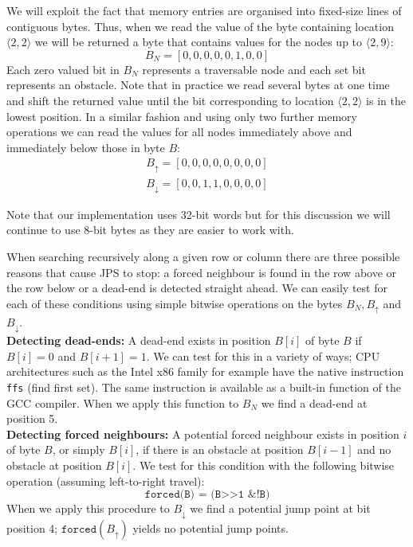 We will exploit the fact that memory entries are organised into fixed-size 
lines of contiguous bytes. Thus, when we read the value of the
byte containing location $\langle 2, 2\rangle$ we will be returned a byte
that contains values for the nodes up to $\langle 2, 9\rangle$:
\begin{equation}
B_{N} = [0,0,0,0,0,1,0,0]
\end{equation}
Each zero valued bit in $B_N$ represents a traversable node and each set bit
represents an obstacle.  Note that in practice we read several bytes at one
time and shift the returned value until the bit corresponding to location
$\langle 2, 2\rangle$ is in the lowest position. In a similar fashion and
using only two further memory operations we can read the values for all nodes
immediately above and immediately below those in byte $B$:
\begin{gather}
B_{\uparrow} = [0, 0, 0, 0, 0, 0, 0, 0]\\
B_{\downarrow} = [0, 0, 1, 1, 0, 0, 0, 0]
\end{gather}

Note that our implementation uses 32-bit words but for this discussion
we will continue to use 8-bit bytes as they are easier to work with.  

When searching recursively along a given row or column
there are three possible reasons that cause JPS to stop: 
a forced neighbour is found in the row above or the row below or a 
dead-end is detected straight ahead.
We can easily test for each of these conditions using simple
bitwise operations on the bytes $B_{N}, B_{\uparrow}$ and $B_{\downarrow}$.
\\ \noindent
\textbf{Detecting dead-ends:}
A dead-end exists in position $B[i]$ of byte $B$ if $B[i] = 0$ and 
$B[i+1] = 1$. We can test for this in a variety of ways;
CPU architectures such as the Intel x86 family for example have the native 
instruction \texttt{ffs} (find first set). The same instruction is available as
a built-in function of the \textsc{GCC} compiler. When we apply
this function to $B_{N}$ we find a dead-end at position 5.
\\ \noindent
\textbf{Detecting forced neighbours:}
A potential forced neighbour exists in position $i$ of byte $B$, or simply 
$B[i]$, if there is an obstacle at position $B[i-1]$ 
and no obstacle at position $B[i]$. We test for this condition with the
following bitwise operation (assuming left-to-right travel):
\begin{equation}
\texttt{forced(B) = (B>>1\ \& !B)}
\end{equation}
When we apply this procedure to $B_{\downarrow}$ we find a potential jump 
point at bit position 4; $\texttt{forced}(B_{\uparrow})$ yields no potential jump points.

